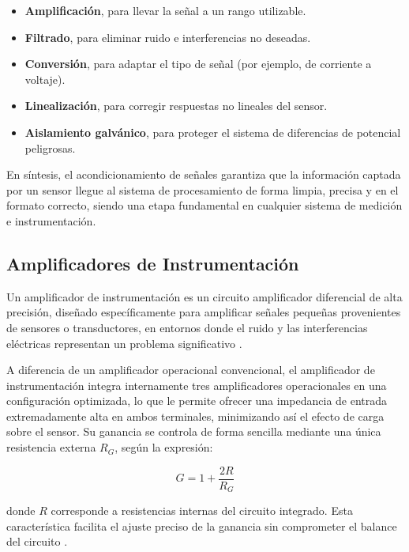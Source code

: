 \documentclass[journal, onecolumn]{IEEEtran}
\begin{document}
\begin{itemize}
    \item \textbf{Amplificación}, para llevar la señal a un rango utilizable.
    \item \textbf{Filtrado}, para eliminar ruido e interferencias no deseadas.
    \item \textbf{Conversión}, para adaptar el tipo de señal (por ejemplo, de corriente a voltaje).
    \item \textbf{Linealización}, para corregir respuestas no lineales del sensor.
    \item \textbf{Aislamiento galvánico}, para proteger el sistema de diferencias de potencial peligrosas.
\end{itemize}

En síntesis, el acondicionamiento de señales garantiza que la información captada por un sensor llegue al sistema de procesamiento de forma limpia, precisa y en el formato correcto, siendo una etapa fundamental en cualquier sistema de medición  e instrumentación.\cite{Horowitz1989} 

\subsection{Amplificadores de Instrumentación} 

Un amplificador de instrumentación es un circuito amplificador diferencial de alta  precisión, diseñado específicamente para amplificar señales pequeñas provenientes de sensores o transductores, en entornos donde el ruido y las interferencias  eléctricas representan un problema significativo \cite{Mancini2002, Horowitz1989}.

A diferencia de un amplificador operacional convencional, el amplificador de instrumentación integra internamente tres amplificadores operacionales en una  configuración optimizada, lo que le permite ofrecer una impedancia de entrada  extremadamente alta en ambos terminales, minimizando así el efecto de carga sobre  el sensor. Su ganancia se controla de forma sencilla mediante una única resistencia  externa $R_G$, según la expresión:

\begin{equation}
    G = 1 + \frac{2R}{R_G}
\end{equation}

donde $R$ corresponde a resistencias internas del circuito integrado. Esta característica facilita el ajuste preciso de la ganancia sin comprometer el balance del circuito \cite{Mancini2002}.
\end{document}
